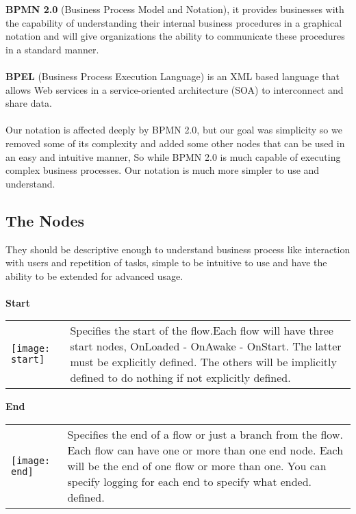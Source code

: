 \textbf{BPMN 2.0} \cite{OMG-BPMN} (Business Process Model and Notation), it provides
businesses with the capability of understanding their internal business procedures in a graphical
notation and will give organizations the ability to communicate these procedures in a standard
manner.\\\\
\textbf{BPEL} \cite{OASIS-BPEL} (Business Process Execution Language) is an XML based language that allows Web services
in a service-oriented architecture (SOA) to interconnect and share data.\\\\
Our notation is affected deeply by BPMN 2.0, but our goal was simplicity so we removed some of its
complexity and added some other nodes that can be used in an easy and intuitive manner, So while
BPMN 2.0 is much capable of executing complex business processes. Our notation is much more
simpler to use and understand.

\subsection{The Nodes}
They should be descriptive enough to understand business process like interaction with users and
repetition of tasks, simple to be intuitive to use and have the ability to be extended for advanced
usage. \\\\

\large \textbf{Start}\\

\begin{tabular}{C{2.2cm}  L{15cm}}
    \texttt{[image: start]} & Specifies the start of the flow.\newline Each flow will have three start nodes,
    OnLoaded - OnAwake - OnStart. \newline
    The latter must be explicitly defined.\newline
The others will be implicitly defined to do nothing if not explicitly
defined.
\end{tabular}

\break

\large \textbf{End}\\

\begin{tabular}{C{2.2cm}  L{15cm}}
    \texttt{[image: end]} & Specifies the end of a flow or just a branch from the flow.
    \newline Each flow can have one or more than one end node.
    \newline Each will be the end of one flow or more than one.
    \newline You can specify logging for each end to specify what ended.
defined.
\end{tabular}

